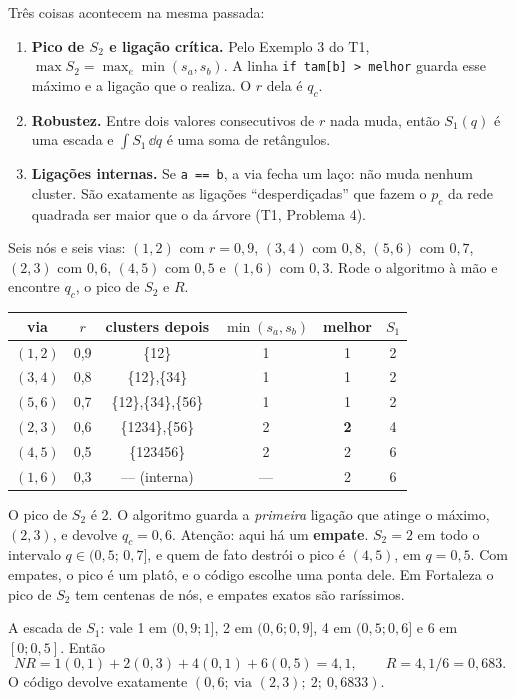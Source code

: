 \documentclass[11pt]{article}
\begin{document}
Três coisas acontecem na mesma passada:
\begin{enumerate}
  \item \textbf{Pico de $S_2$ e ligação crítica.} Pelo Exemplo 3 do T1, $\max S_2 = \max_e\min(s_a,s_b)$. A linha \texttt{if tam[b] > melhor} guarda esse máximo e a ligação que o realiza. O $r$ dela é $q_c$.
  \item \textbf{Robustez.} Entre dois valores consecutivos de $r$ nada muda, então $S_1(q)$ é uma escada e $\int S_1\,\dd q$ é uma soma de retângulos.
  \item \textbf{Ligações internas.} Se \texttt{a == b}, a via fecha um laço: não muda nenhum cluster. São exatamente as ligações ``desperdiçadas'' que fazem o $p_c$ da rede quadrada ser maior que o da árvore (T1, Problema 4).
\end{enumerate}

\begin{exemplo}
Seis nós e seis vias: $(1,2)$ com $r=0{,}9$, $(3,4)$ com $0{,}8$, $(5,6)$ com $0{,}7$, $(2,3)$ com $0{,}6$, $(4,5)$ com $0{,}5$ e $(1,6)$ com $0{,}3$. Rode o algoritmo à mão e encontre $q_c$, o pico de $S_2$ e $R$.
\end{exemplo}
\begin{solucao}
\begin{center}
\begin{tabular}{cccccc}
\toprule
via & $r$ & clusters depois & $\min(s_a,s_b)$ & melhor & $S_1$\\
\midrule
$(1,2)$ & 0,9 & \{12\} & 1 & 1 & 2\\
$(3,4)$ & 0,8 & \{12\},\{34\} & 1 & 1 & 2\\
$(5,6)$ & 0,7 & \{12\},\{34\},\{56\} & 1 & 1 & 2\\
$(2,3)$ & 0,6 & \{1234\},\{56\} & 2 & \textbf{2} & 4\\
$(4,5)$ & 0,5 & \{123456\} & 2 & 2 & 6\\
$(1,6)$ & 0,3 & --- (interna) & --- & 2 & 6\\
\bottomrule
\end{tabular}
\end{center}
O pico de $S_2$ é 2. O algoritmo guarda a \emph{primeira} ligação que atinge o máximo, $(2,3)$, e devolve $q_c = 0{,}6$. Atenção: aqui há um \textbf{empate}. $S_2 = 2$ em todo o intervalo $q\in(0{,}5;\,0{,}7]$, e quem de fato destrói o pico é $(4,5)$, em $q=0{,}5$. Com empates, o pico é um platô, e o código escolhe uma ponta dele. Em Fortaleza o pico de $S_2$ tem centenas de nós, e empates exatos são raríssimos.

A escada de $S_1$: vale 1 em $(0{,}9;1]$, 2 em $(0{,}6;0{,}9]$, 4 em $(0{,}5;0{,}6]$ e 6 em $[0;0{,}5]$. Então
\[
NR = 1(0{,}1)+2(0{,}3)+4(0{,}1)+6(0{,}5) = 4{,}1,\qquad R = 4{,}1/6 = 0{,}683.
\]
O código devolve exatamente $(0{,}6;\ \text{via }(2,3);\ 2;\ 0{,}6833)$.
\end{solucao}
\end{document}
